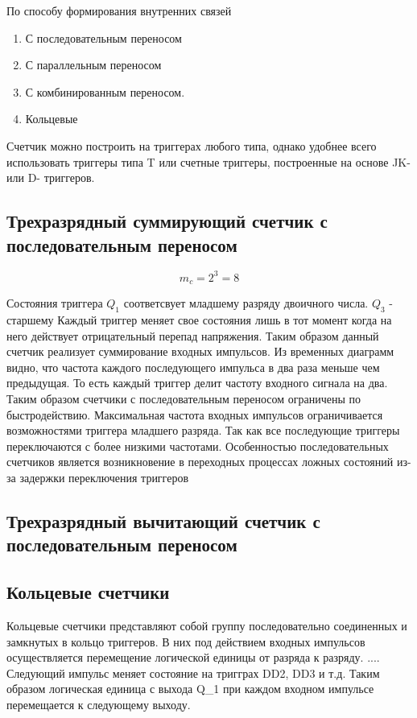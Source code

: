 \documentclass[a4paper]{article}
\begin{document}
    По способу формирования внутренних связей
    \begin{enumerate}
        \item С последовательным переносом
        \item С параллельным переносом
        \item С комбинированным переносом.
        \item Кольцевые
    \end{enumerate}

    Счетчик можно построить на триггерах любого типа, однако удобнее всего использовать триггеры типа T или счетные триггеры, построенные на основе JK- или D- триггеров.

    \subsection{Трехразрядный суммирующий счетчик с последовательным переносом}
    $$m_c = 2^3 = 8$$

    Состояния триггера $Q_1$ соответсвует младшему разряду двоичного числа. $Q_3$ - старшему
    Каждый триггер меняет свое состояния лишь в тот момент когда на него действует отрицательный перепад напряжения. Таким образом данный счетчик реализует суммирование входных импульсов. Из временных диаграмм видно, что частота каждого последующего импульса в два раза меньше чем предыдущая. То есть каждый триггер делит частоту входного сигнала на два. Таким образом счетчики с последовательным переносом ограничены по быстродействию. Максимальная частота входных импульсов ограничивается возможностями триггера младшего разряда. Так как все последующие триггеры переключаются с более низкими частотами. Особенностью последовательных счетчиков является возникновение в переходных процессах ложных состояний из-за задержки переключения триггеров

    \subsection{Трехразрядный вычитающий счетчик с последовательным переносом}


    \subsection{Кольцевые счетчики}
    Кольцевые счетчики представляют собой группу последовательно соединенных и замкнутых в кольцо триггеров. В них под действием входных импульсов осуществляется перемещение логической единицы от разряда к разряду.
    ....
    Следующий импульс меняет состояние на тригграх DD2, DD3 и т.д.
    Таким образом логическая единица с выхода Q_1 при каждом входном импульсе перемещается к следующему выходу.
\end{document}
